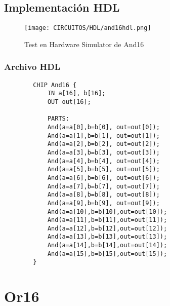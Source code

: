 \documentclass[12pt]{article}
\begin{document}
    \subsection{Implementación HDL}
        \begin{figure}[H]
            \centering
            \texttt{[image: CIRCUITOS/HDL/and16hdl.png]}
            \caption{Test en Hardware Simulator de And16 \cite{nand2tetris}}
            \label{fig:hdland16}
        \end{figure}
        \subsubsection{Archivo HDL}
            \begin{lstlisting}
        CHIP And16 {
            IN a[16], b[16];
            OUT out[16];
        
            PARTS:
            And(a=a[0],b=b[0], out=out[0]);
            And(a=a[1],b=b[1], out=out[1]);
            And(a=a[2],b=b[2], out=out[2]);
            And(a=a[3],b=b[3], out=out[3]);
            And(a=a[4],b=b[4], out=out[4]);
            And(a=a[5],b=b[5], out=out[5]);
            And(a=a[6],b=b[6], out=out[6]);
            And(a=a[7],b=b[7], out=out[7]);
            And(a=a[8],b=b[8], out=out[8]);
            And(a=a[9],b=b[9], out=out[9]);
            And(a=a[10],b=b[10],out=out[10]);
            And(a=a[11],b=b[11],out=out[11]);
            And(a=a[12],b=b[12],out=out[12]);
            And(a=a[13],b=b[13],out=out[13]);
            And(a=a[14],b=b[14],out=out[14]);
            And(a=a[15],b=b[15],out=out[15]);
        }
            \end{lstlisting}
    \newpage
    

\section{Or16}
\end{document}
